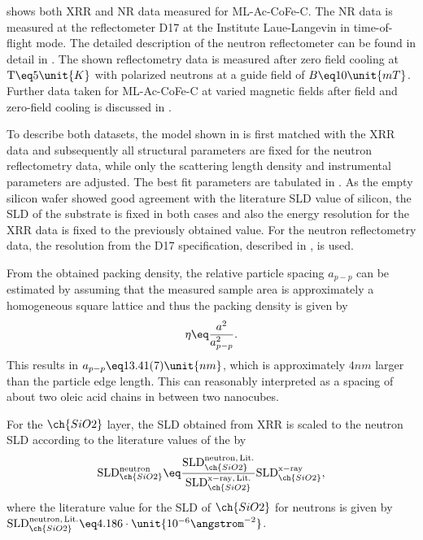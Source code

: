 \documentclass[\main/dresen_thesis.tex]{subfiles}
\begin{document}
   shows both XRR and NR data measured for ML-Ac-CoFe-C.
  The NR data is measured at the reflectometer D17 at the Institute Laue-Langevin in time-of-flight mode.
  The detailed description of the neutron reflectometer can be found in detail in .
  The shown reflectometry data is measured after zero field cooling at $\mathrm{T} \eq 5 \unit{K}$ with polarized neutrons at a guide field of $B \eq 10 \unit{mT}$.
  Further data taken for ML-Ac-CoFe-C at varied magnetic fields after field and zero-field cooling is discussed in .

  To describe both datasets, the model shown in  is first matched with the XRR data and subsequently all structural parameters are fixed for the neutron reflectometry data, while only the scattering length density and instrumental parameters are adjusted.
  The best fit parameters are tabulated in .
  As the empty silicon wafer showed good agreement with the literature SLD value of silicon, the SLD of the substrate is fixed in both cases and also the energy resolution for the XRR data is fixed to the previously obtained value.
  For the neutron reflectometry data, the resolution from the D17 specification, described in \cite{Gutfreund_2018_Towar}, is used.

  From the obtained packing density, the relative particle spacing $a_{p-p}$ can be estimated by assuming that the measured sample area is approximately a homogeneous square lattice and thus the packing density is given by
  \begin{align}
    \eta \eq \frac{a^2}{a_{p-p}^2}.
  \end{align}
  This results in $a_{p-p} \eq 13.41(7) \unit{nm}$, which is approximately $4 \unit{nm}$ larger than the particle edge length.
  This can reasonably interpreted as a spacing of about two oleic acid chains in between two nanocubes.

  For the $\ch{SiO2}$ layer, the SLD obtained from XRR is scaled to the neutron SLD according to the literature values of the  by
  \begin{align}
    \mathrm{SLD}_{\ch{SiO2}}^{\mathrm{neutron} }\eq \frac{\mathrm{SLD}_{\ch{SiO2}}^{\mathrm{neutron, \,Lit.}}}{\mathrm{SLD}_{\ch{SiO2}}^{\mathrm{x-ray, \,Lit.}}} \mathrm{SLD}_{\ch{SiO2}}^{\mathrm{x-ray}},
  \end{align}
  where the literature value for the SLD of $\ch{SiO2}$ for neutrons is given by $\mathrm{SLD}_{\ch{SiO2}}^{\mathrm{neutron, \,Lit.}} \eq 4.186 \cdot \unit{10^{-6} \angstrom^{-2}}$.
\end{document}
